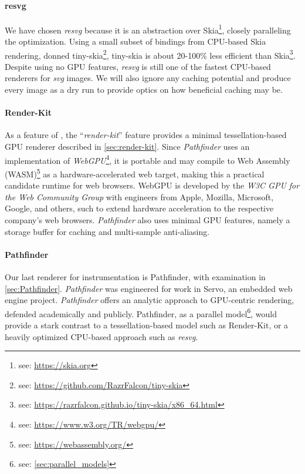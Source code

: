 \paragraph{resvg} We have chosen \textit{resvg} because it is an abstraction over Skia\footnote{see: \href{https://skia.org}{https://skia.org}}, closely paralleling the optimization. Using a small subset of bindings from CPU-based Skia rendering, donned tiny-skia\footnote{see: \href{https://github.com/RazrFalcon/tiny-skia}{https://github.com/RazrFalcon/tiny-skia}}, tiny-skia is about 20-100\% less efficient than Skia\footnote{see: \href{https://razrfalcon.github.io/tiny-skia/x86_64.html}{https://razrfalcon.github.io/tiny-skia/x86\_64.html}}. Despite using no GPU features, \textit{resvg} is still one of the fastest CPU-based renderers for \textit{svg} images. We will also ignore any caching potential and produce every image as a dry run to provide optics on how beneficial caching may be.

\paragraph{Render-Kit} As a feature of \toolname, the ``\textit{render-kit}'' feature provides a minimal tessellation-based GPU renderer described in \cref{sec:render-kit}. Since \textit{Pathfinder} uses an implementation of \textit{WebGPU}\footnote{see: \href{https://www.w3.org/TR/webgpu/}{https://www.w3.org/TR/webgpu/}}, it is portable and may compile to Web Assembly (WASM)\footnote{see: \href{https://webassembly.org/}{https://webassembly.org/}} as a hardware-accelerated web target, making this a practical candidate runtime for web browsers. WebGPU is developed by the \textit{W3C GPU for the Web Community Group} with engineers from Apple, Mozilla, Microsoft, Google, and others\cite{WebGPU}, such to extend hardware acceleration to the respective company's web browsers. \textit{Pathfinder} also uses minimal GPU features, namely a storage buffer for caching and multi-sample anti-aliasing.

\paragraph{Pathfinder} Our last renderer for instrumentation is Pathfinder, with examination in \cref{sec:Pathfinder}. \textit{Pathfinder} was engineered for work in Servo, an embedded web engine project. \textit{Pathfinder} offers an analytic approach to GPU-centric rendering, defended academically and publicly\cite{Walton18}. Pathfinder, as a parallel model\footnote{see: \cref{sec:parallel_models}}, would provide a stark contrast to a tessellation-based model such as Render-Kit, or a heavily optimized CPU-based approach such as \textit{resvg}.

